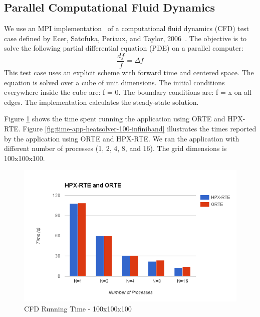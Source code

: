 \subsection{Parallel Computational Fluid Dynamics}
We use an MPI implementation~\cite{resch1999comparison} of a computational fluid dynamics (CFD) test case defined by Ecer, Satofuka, Periaux, and Taylor, 2006~\cite{ecer1996parallel}.
The objective is to solve the following partial differential equation (PDE) on a parallel computer:
\[
\frac{df}{f} = \Delta f
\]
This test case uses an explicit scheme with forward time and centered space. The equation is solved over a cube of unit dimensions. The initial conditions everywhere inside the cube are: f = 0. The boundary conditions are: f = x on all edges. The implementation calculates the steady-state solution.

Figure \ref{fig:time-all-heatsolver-100-infiniband} shows the time spent running the application using ORTE and HPX-RTE. Figure \ref{fig:time-app-heatsolver-100-infiniband} illustrates the times reported by the application using ORTE and HPX-RTE. We ran the application with different number of processes (1, 2, 4, 8, and 16). The grid dimensions is 100x100x100.


\begin{figure}[h!]
  \centering
  \includegraphics[scale=0.7]{images/time-all-heatsolver-100-infiniband.png}
  \caption[CFD Running Time - 100x100x100]{CFD Running Time - 100x100x100}
  \label{fig:time-all-heatsolver-100-infiniband}
\end{figure}

